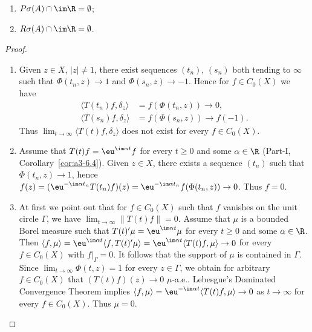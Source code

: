 \begin{example}
\begin{enumerate}[\upshape (i), wide, labelindent=.25em]
\begin{enumerate}[\upshape (i)]
	\item 
	$P\sigma(A)\cap\im\R = \emptyset$;
	
	\item 
	$R\sigma(A)\cap\im\R = \emptyset$.
\end{enumerate}
\begin{proof}
\begin{enumerate}[\upshape (i), wide, labelindent=.25em]

\item
Given $z \in X$, $|z| \neq 1$, there exist sequences $(t_n)$, $(s_n)$ both tending to $\infty$ such that $\Phi(t_n,z) \to 1$ and $\Phi(s_n,z) \to -1$. 
Hence for $f \in C_{0}(X)$ we have
\[
   \begin{aligned}
   \langle T(t_n)f,\delta_z \rangle &= f(\Phi(t_n,z)) \to 0 ,\\
   \langle T(s_n)f,\delta_z \rangle &= f(\Phi(s_n,z)) \to f(-1) .
   \end{aligned}
\]
Thus $\lim_{t\to\infty} \langle T(t)f,\delta_z \rangle$ does not exist for every $f \in C_{0}(X)$.


\item
Assume that $T(t)f = \eu^{\im\alpha t}f$ for every $t \geq 0$ and some $\alpha \in \R$ (\cf Part-I, Corollary~\ref{cor:a3-6.4}). 
Given $z \in X$, there exists a sequence $(t_n)$ such that $\Phi(t_n,z) \to 1$, hence
$f(z) = (\eu^{-\im\alpha t_n}T(t_n)f)(z) = \eu^{-\im\alpha t_n}f(\Phi(t_n,z)) \to 0$. Thus $f = 0$.


\item
At first we point out that for $f \in C_{0}(X)$ such that $f$ vanishes on the unit circle $\Gamma$, we have $\lim_{t\to\infty} \|T(t)f\| = 0$.
Assume that $\mu$ is a bounded Borel measure such that $T(t)'\mu = \eu^{\im\alpha t}\mu$ for every $t \geq 0$ and some $\alpha \in \R$. 
Then $\langle f,\mu \rangle = \eu^{\im\alpha t}\langle f,T(t)'\mu \rangle = \eu^{\im\alpha t}\langle T(t)f,\mu \rangle \to 0$ for every $f \in C_{0}(X)$ with $f|_\Gamma = 0$. 
It follows that the support of\/ $\mu$ is contained in $\Gamma$. Since $\lim_{t\to\infty} \Phi(t,z) = 1$ for every $z \in \Gamma$, we obtain for arbitrary $f \in C_{0}(X)$ that $(T(t)f)(z) \to 0$ $\mu$-a.e.. 
Lebesgue's Dominated Convergence Theorem implies $\langle f,\mu \rangle = \eu^{-\im\alpha t}\langle T(t)f,\mu \rangle \to 0$ as $t \to \infty$ for every $f \in C_{0}(X)$. Thus $\mu = 0$.
\end{enumerate}
\end{proof}
\end{enumerate}
\end{example}
